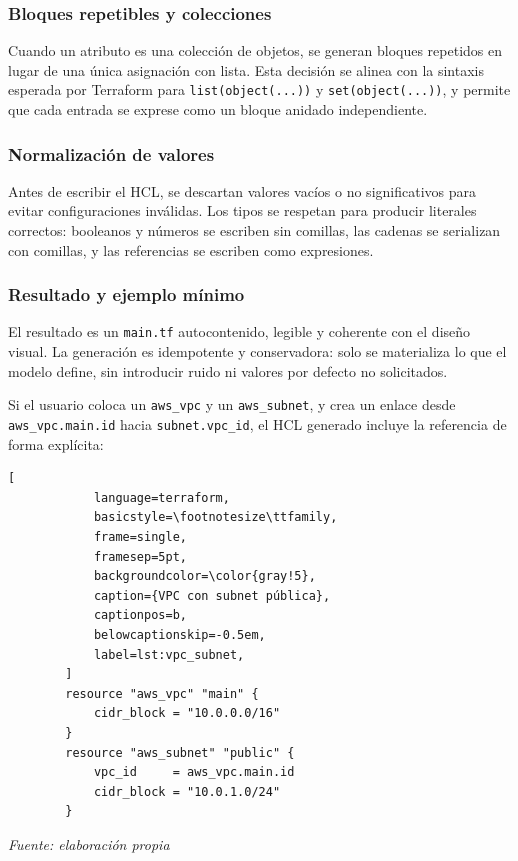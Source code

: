 \documentclass{article}
\begin{document}
{        \subsubsection*{Bloques repetibles y colecciones}
        \justify
        Cuando un atributo es una colección de objetos, se generan bloques repetidos en lugar de una única
        asignación con lista. Esta decisión se alinea con la sintaxis esperada
        por Terraform para \texttt{list(object(...))} y
        \texttt{set(object(...))}, y permite que cada entrada se exprese como
        un bloque anidado independiente.

        \subsubsection*{Normalización de valores}
        \justify
        Antes de escribir el HCL, se descartan valores vacíos o no
        significativos para
        evitar configuraciones inválidas. Los tipos se respetan para producir
        literales correctos: booleanos y números se escriben sin comillas, las
        cadenas se serializan con comillas, y las referencias se escriben como
        expresiones.

        \subsubsection*{Resultado y ejemplo mínimo}
        \justify
        El resultado es un \texttt{main.tf} autocontenido, legible y coherente
        con el diseño visual. La generación es idempotente y conservadora: solo
        se materializa lo que el modelo define, sin introducir ruido ni valores
        por defecto no solicitados.

        \justify
        Si el usuario coloca un \texttt{aws\_vpc} y un \texttt{aws\_subnet}, y
        crea un enlace desde \texttt{aws\_vpc.main.id} hacia
        \texttt{subnet.vpc\_id}, el HCL generado incluye la referencia de forma
        explícita:

        \vspace{1em}
        \begin{lstlisting}[
            language=terraform,
            basicstyle=\footnotesize\ttfamily,
            frame=single,
            framesep=5pt,
            backgroundcolor=\color{gray!5},
            caption={VPC con subnet pública},
            captionpos=b,
            belowcaptionskip=-0.5em,
            label=lst:vpc_subnet,
        ]
        resource "aws_vpc" "main" {
            cidr_block = "10.0.0.0/16"
        }
        resource "aws_subnet" "public" {
            vpc_id     = aws_vpc.main.id
            cidr_block = "10.0.1.0/24"
        }
        \end{lstlisting}
        \begin{center}
        \footnotesize\textit{Fuente: elaboración propia}
        \end{center}


    }
\end{document}
